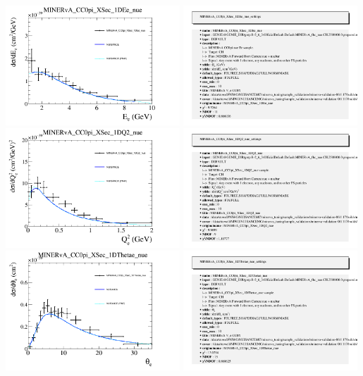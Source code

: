 \documentclass{article}
\begin{document}
\centering
\includegraphics[width=0.49\textwidth]{figures/nuisance_MINERvA_CC0pi_XSec_1DEe_nue_comp.png}
\includegraphics[width=0.49\textwidth]{figures/nuisance_MINERvA_CC0pi_XSec_1DEe_nue_info.png}
\centering
\includegraphics[width=0.49\textwidth]{figures/nuisance_MINERvA_CC0pi_XSec_1DQ2_nue_comp.png}
\includegraphics[width=0.49\textwidth]{figures/nuisance_MINERvA_CC0pi_XSec_1DQ2_nue_info.png}
\centering
\includegraphics[width=0.49\textwidth]{figures/nuisance_MINERvA_CC0pi_XSec_1DThetae_nue_comp.png}
\includegraphics[width=0.49\textwidth]{figures/nuisance_MINERvA_CC0pi_XSec_1DThetae_nue_info.png}
\end{document}

